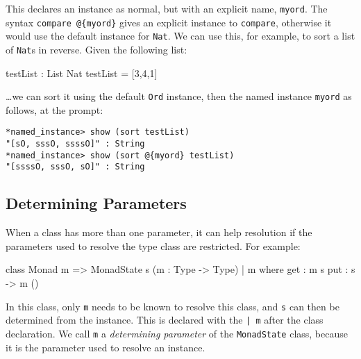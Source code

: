 \noindent
This declares an instance as normal, but with an explicit name, \texttt{myord}.
The syntax \texttt{compare @\{myord\}} gives an explicit instance to \texttt{compare}, otherwise it would use the default instance for \texttt{Nat}.
We can use this, for example, to sort a list of \texttt{Nat}s in reverse.
Given the following list:

\begin{code}
testList : List Nat
testList = [3,4,1]
\end{code}

\noindent
\ldots we can sort it using the default \texttt{Ord} instance, then the named instance \texttt{myord} as follows, at the \Idris{} prompt:

\begin{lstlisting}[style=stdout]
*named_instance> show (sort testList)
"[sO, sssO, ssssO]" : String
*named_instance> show (sort @{myord} testList)
"[ssssO, sssO, sO]" : String
\end{lstlisting}

\subsection{Determining Parameters}

When a class has more than one parameter, it can help resolution if the
parameters used to resolve the type class are restricted. For example:

\begin{code}
class Monad m => MonadState s (m : Type -> Type) | m where
    get : m s
    put : s -> m ()
\end{code}

\noindent
In this class, only \texttt{m} needs to be known to resolve this class, and
\texttt{s} can then be determined from the instance. This is declared
with the \texttt{| m} after the class declaration. We call \texttt{m}
a \emph{determining parameter} of the \texttt{MonadState} class, because it
is the parameter used to resolve an instance. 

